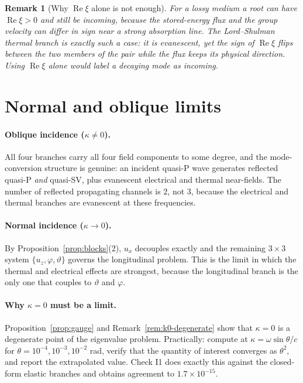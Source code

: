 \documentclass[11pt]{article}
\newcommand{\bth}{\vartheta}
\theoremstyle{plain}
\newtheorem{remark}{Remark}
\begin{document}
\begin{remark}[Why $\operatorname{Re}\xi$ alone is not enough]
\label{rem:not-re-enough}
For a lossy medium a root can have $\operatorname{Re}\xi>0$ and still be
incoming, because the stored-energy flux and the group velocity can differ in
sign near a strong absorption line. The Lord--Shulman thermal branch is exactly
such a case: it is evanescent, yet the sign of $\operatorname{Re}\xi$ flips
between the two members of the pair while the flux keeps its physical direction.
Using $\operatorname{Re}\xi$ alone would label a decaying mode as incoming.
\end{remark}

\section{Normal and oblique limits}
\label{sec:limits}

\paragraph{Oblique incidence ($\kappa\neq0$).} All four branches carry all four
field components to some degree, and the mode-conversion structure is genuine:
an incident quasi-P wave generates reflected quasi-P \emph{and} quasi-SV, plus
evanescent electrical and thermal near-fields. The number of reflected propagating
channels is $2$, not $3$, because the electrical and thermal branches are
evanescent at these frequencies.

\paragraph{Normal incidence ($\kappa\to0$).} By
Proposition~\ref{prop:blocks}(2), $u_x$ decouples exactly and the remaining
$3\times3$ system $\{u_z,\varphi,\bth\}$ governs the longitudinal problem. This is
the limit in which the thermal and electrical effects are strongest, because the
longitudinal branch is the only one that couples to $\bth$ and $\varphi$.

\paragraph{Why $\kappa=0$ must be a limit.} Proposition~\ref{prop:gauge} and
Remark~\ref{rem:k0-degenerate} show that $\kappa=0$ is a degenerate point of the
eigenvalue problem. Practically: compute at $\kappa=\omega\sin\theta/c$ for
$\theta=10^{-4},10^{-3},10^{-2}$ rad, verify that the quantity of interest
converges as $\theta^2$, and report the extrapolated value. Check I1 does exactly
this against the closed-form elastic branches and obtains agreement to
$1.7\times10^{-15}$.
\end{document}
